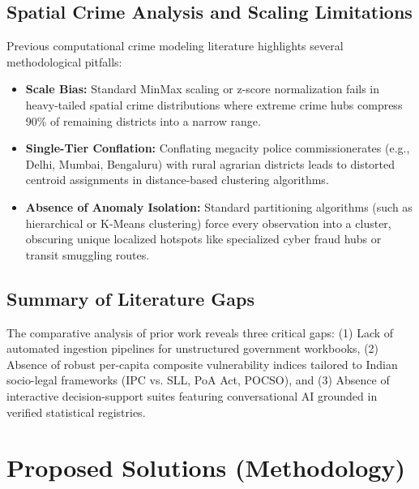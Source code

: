 \documentclass[12pt,a4paper]{report}
\begin{document}
\section{Spatial Crime Analysis and Scaling Limitations}
Previous computational crime modeling literature highlights several methodological pitfalls:
\begin{itemize}[leftmargin=*]
    \item \textbf{Scale Bias:} Standard MinMax scaling or z-score normalization fails in heavy-tailed spatial crime distributions where extreme crime hubs compress 90\% of remaining districts into a narrow range.
    \item \textbf{Single-Tier Conflation:} Conflating megacity police commissionerates (e.g., Delhi, Mumbai, Bengaluru) with rural agrarian districts leads to distorted centroid assignments in distance-based clustering algorithms.
    \item \textbf{Absence of Anomaly Isolation:} Standard partitioning algorithms (such as hierarchical or K-Means clustering) force every observation into a cluster, obscuring unique localized hotspots like specialized cyber fraud hubs or transit smuggling routes.
\end{itemize}

\section{Summary of Literature Gaps}
The comparative analysis of prior work reveals three critical gaps: (1) Lack of automated ingestion pipelines for unstructured government workbooks, (2) Absence of robust per-capita composite vulnerability indices tailored to Indian socio-legal frameworks (IPC vs. SLL, PoA Act, POCSO), and (3) Absence of interactive decision-support suites featuring conversational AI grounded in verified statistical registries.

\chapter{Proposed Solutions (Methodology)}
\end{document}
